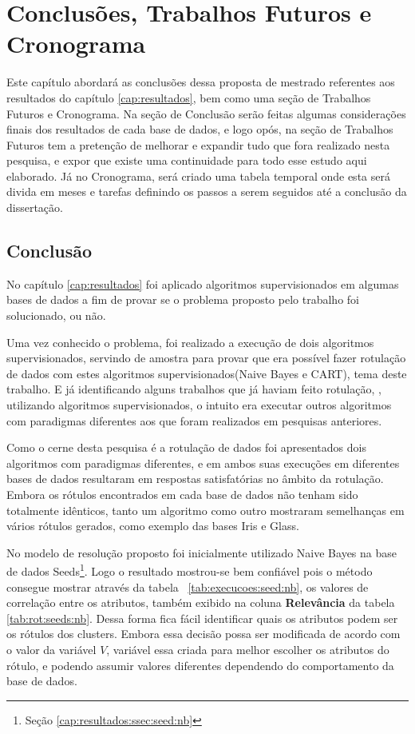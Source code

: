 \chapter{Conclusões, Trabalhos Futuros e Cronograma}\label{cap:conclusao} 

Este capítulo abordará as conclusões dessa  proposta de mestrado referentes aos resultados do capítulo \ref{cap:resultados},  bem como uma seção de Trabalhos Futuros e  Cronograma. Na seção de Conclusão serão feitas algumas considerações finais dos resultados de cada base de dados, e logo opós, na seção de Trabalhos Futuros tem a pretenção de melhorar e expandir tudo que fora realizado  nesta pesquisa, e expor que existe uma continuidade para todo esse estudo aqui elaborado. Já no Cronograma, será criado uma tabela temporal onde esta será divida em meses e tarefas definindo os passos a serem seguidos até a conclusão da dissertação.

\section{Conclusão}\label{cond}
No capítulo \ref{cap:resultados} foi aplicado algoritmos supervisionados em algumas bases de dados a fim de provar se o problema proposto pelo trabalho foi solucionado, ou não.

Uma vez conhecido o problema, foi realizado a execução de dois algoritmos supervisionados, servindo de amostra para provar que era possível fazer rotulação de dados com estes algoritmos supervisionados(Naive Bayes e CART), tema deste trabalho. E já identificando alguns trabalhos que já haviam feito rotulação, \cite{Lopes}, utilizando algoritmos supervisionados, o intuito era executar outros algoritmos com paradigmas diferentes aos que foram realizados em pesquisas anteriores. 

Como o cerne desta pesquisa é a rotulação de dados foi apresentados dois algoritmos com paradigmas diferentes, e em ambos suas execuções em diferentes bases de dados resultaram em respostas satisfatórias no âmbito da rotulação. Embora os rótulos encontrados  em cada base de dados não tenham sido totalmente idênticos, tanto um algoritmo como outro mostraram semelhanças em vários rótulos gerados, como exemplo das bases Iris e Glass.

No modelo de resolução proposto foi inicialmente utilizado Naive Bayes na base de dados Seeds\footnote{Seção \ref{cap:resultados:ssec:seed:nb}}. Logo o resultado mostrou-se bem confiável pois o método consegue mostrar através da tabela ~\ref{tab:execucoes:seed:nb}, os valores de correlação entre os atributos, também exibido na coluna \textbf{Relevância} da tabela \ref{tab:rot:seeds:nb}. Dessa forma fica fácil identificar quais os atributos podem ser os rótulos dos clusters. Embora essa decisão possa ser modificada de acordo com o valor da variável ${V}$, variável essa criada para melhor escolher os atributos do rótulo, e podendo assumir valores diferentes dependendo do comportamento da base de dados.

